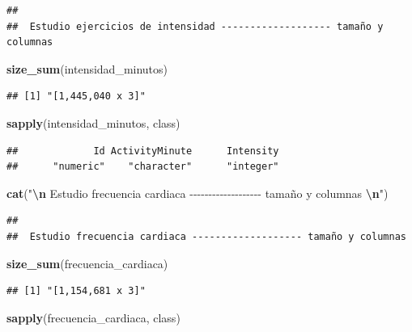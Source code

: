 \documentclass[
]{article}
\newenvironment{Shaded}{\begin{snugshade}}{\end{snugshade}}
\newcommand{\FunctionTok}[1]{\textcolor[rgb]{0.13,0.29,0.53}{\textbf{#1}}}
\newcommand{\NormalTok}[1]{#1}
\newcommand{\SpecialCharTok}[1]{\textcolor[rgb]{0.81,0.36,0.00}{\textbf{#1}}}
\newcommand{\StringTok}[1]{\textcolor[rgb]{0.31,0.60,0.02}{#1}}
\begin{document}
\begin{verbatim}
## 
##  Estudio ejercicios de intensidad ------------------- tamaño y columnas
\end{verbatim}

\begin{Shaded}
\begin{Highlighting}[]
\FunctionTok{size\_sum}\NormalTok{(intensidad\_minutos)}
\end{Highlighting}
\end{Shaded}

\begin{verbatim}
## [1] "[1,445,040 x 3]"
\end{verbatim}

\begin{Shaded}
\begin{Highlighting}[]
\FunctionTok{sapply}\NormalTok{(intensidad\_minutos, class)}
\end{Highlighting}
\end{Shaded}

\begin{verbatim}
##             Id ActivityMinute      Intensity 
##      "numeric"    "character"      "integer"
\end{verbatim}

\begin{Shaded}
\begin{Highlighting}[]
\FunctionTok{cat}\NormalTok{(}\StringTok{"}\SpecialCharTok{\textbackslash{}n}\StringTok{ Estudio frecuencia cardiaca {-}{-}{-}{-}{-}{-}{-}{-}{-}{-}{-}{-}{-}{-}{-}{-}{-}{-}{-} tamaño y columnas }\SpecialCharTok{\textbackslash{}n}\StringTok{"}\NormalTok{)}
\end{Highlighting}
\end{Shaded}

\begin{verbatim}
## 
##  Estudio frecuencia cardiaca ------------------- tamaño y columnas
\end{verbatim}

\begin{Shaded}
\begin{Highlighting}[]
\FunctionTok{size\_sum}\NormalTok{(frecuencia\_cardiaca)}
\end{Highlighting}
\end{Shaded}

\begin{verbatim}
## [1] "[1,154,681 x 3]"
\end{verbatim}

\begin{Shaded}
\begin{Highlighting}[]
\FunctionTok{sapply}\NormalTok{(frecuencia\_cardiaca, class)}
\end{Highlighting}
\end{Shaded}
\end{document}
